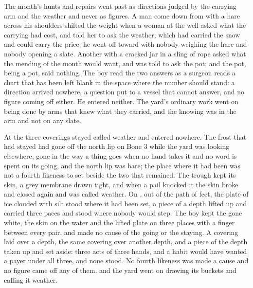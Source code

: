 The month's hunts and repairs went past as directions judged by the carrying arm and the weather and never as figures. A man come down from  with a hare across his shoulders shifted the weight when a woman at the well asked what the carrying had cost, and told her to ask the weather, which had carried the snow and could carry the price; he went off toward  with nobody weighing the hare and nobody opening a slate. Another with a cracked jar in a sling of rope asked what the mending of the month would want, and was told to ask the pot; and the pot, being a pot, said nothing. The boy read the two answers as a surgeon reads a chart that has been left blank in the space where the number should stand: a direction arrived nowhere, a question put to a vessel that cannot answer, and no figure coming off either. He entered neither. The yard's ordinary work went on being done by arms that knew what they carried, and the knowing was in the arm and not on any slate.

\scenebreak

At  the three coverings stayed called weather and entered nowhere. The frost that had stayed had gone off the north lip on Bone 3 while the yard was looking elsewhere, gone in the way a thing goes when no hand takes it and no word is spent on its going, and the north lip was bare; the place where it had been was not a fourth likeness to set beside the two that remained. The trough kept its skin, a grey membrane drawn tight, and when a pail knocked it the skin broke and closed again and was called weather. On , out of the path of feet, the plate of ice clouded with silt stood where it had been set, a piece of a depth lifted up and carried three paces and stood where nobody would step. The boy kept the gone white, the skin on the water and the lifted plate on three places with a finger between every pair, and made no cause of the going or the staying. A covering laid over a depth, the same covering over another depth, and a piece of the depth taken up and set aside: three acts of three hands, and a habit would have wanted a payer under all three, and none stood. No fourth likeness was made a cause and no figure came off any of them, and the yard went on drawing its buckets and calling it weather.

